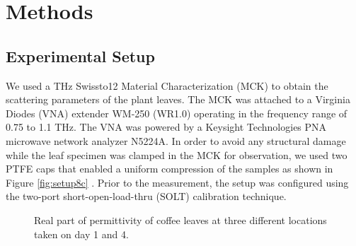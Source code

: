 \documentclass[journal,article,submit,moreauthors,pdftex]{Definitions/mdpi}
\renewcommand{\^}{\hat}  %
\begin{document}
\section{Methods}\label{sec:Experimental}
%
\subsection{Experimental Setup}
%
We used a THz Swissto12 Material Characterization (MCK) to obtain the scattering parameters of the plant leaves. The MCK was attached to a Virginia Diodes (VNA) extender WM-250 (WR1.0) operating in the frequency range of  0.75 to 1.1 THz. The VNA was powered by a Keysight Technologies PNA microwave network analyzer N5224A. In order to avoid any structural damage while the leaf specimen was clamped in the MCK for observation, we used two PTFE caps that enabled a uniform compression of the samples as shown in Figure \ref{fig:setup8c} . Prior to the measurement, the setup was configured using the two-port short-open-load-thru (SOLT) calibration technique.

\begin{figure}[t!]
	\centering
	\hfill
	\caption{Real part of permittivity of coffee leaves at three different locations taken on  day 1 and 4.}
	\label{fig:coffee_days}
\end{figure}
\end{document}
